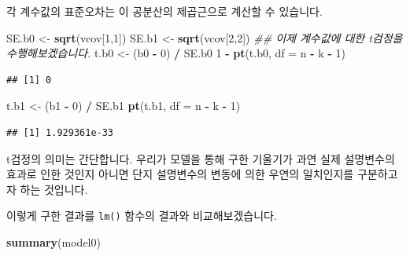 \documentclass[]{book}
\newenvironment{Shaded}{\begin{snugshade}}{\end{snugshade}}
\newcommand{\CommentTok}[1]{\textcolor[rgb]{0.56,0.35,0.01}{\textit{#1}}}
\newcommand{\DataTypeTok}[1]{\textcolor[rgb]{0.13,0.29,0.53}{#1}}
\newcommand{\DecValTok}[1]{\textcolor[rgb]{0.00,0.00,0.81}{#1}}
\newcommand{\KeywordTok}[1]{\textcolor[rgb]{0.13,0.29,0.53}{\textbf{#1}}}
\newcommand{\NormalTok}[1]{#1}
\newcommand{\OperatorTok}[1]{\textcolor[rgb]{0.81,0.36,0.00}{\textbf{#1}}}
\newcommand{\StringTok}[1]{\textcolor[rgb]{0.31,0.60,0.02}{#1}}
\begin{document}
각 계수값의 표준오차는 이 공분산의 제곱근으로 계산할 수 있습니다.

\begin{Shaded}
\begin{Highlighting}[]
\NormalTok{SE.b0 <-}\StringTok{ }\KeywordTok{sqrt}\NormalTok{(vcov[}\DecValTok{1}\NormalTok{,}\DecValTok{1}\NormalTok{])}
\NormalTok{SE.b1 <-}\StringTok{ }\KeywordTok{sqrt}\NormalTok{(vcov[}\DecValTok{2}\NormalTok{,}\DecValTok{2}\NormalTok{])}
\CommentTok{## 이제 계수값에 대한 t검정을 수행해보겠습니다.}
\NormalTok{t.b0 <-}\StringTok{ }\NormalTok{(b0 }\OperatorTok{-}\StringTok{ }\DecValTok{0}\NormalTok{) }\OperatorTok{/}\StringTok{ }\NormalTok{SE.b0}
\DecValTok{1} \OperatorTok{-}\StringTok{ }\KeywordTok{pt}\NormalTok{(t.b0, }\DataTypeTok{df =}\NormalTok{ n }\OperatorTok{-}\StringTok{ }\NormalTok{k }\OperatorTok{-}\StringTok{ }\DecValTok{1}\NormalTok{)}
\end{Highlighting}
\end{Shaded}

\begin{verbatim}
## [1] 0
\end{verbatim}

\begin{Shaded}
\begin{Highlighting}[]
\NormalTok{t.b1 <-}\StringTok{ }\NormalTok{(b1 }\OperatorTok{-}\StringTok{ }\DecValTok{0}\NormalTok{) }\OperatorTok{/}\StringTok{ }\NormalTok{SE.b1}
\KeywordTok{pt}\NormalTok{(t.b1, }\DataTypeTok{df =}\NormalTok{ n }\OperatorTok{-}\StringTok{ }\NormalTok{k }\OperatorTok{-}\StringTok{ }\DecValTok{1}\NormalTok{)}
\end{Highlighting}
\end{Shaded}

\begin{verbatim}
## [1] 1.929361e-33
\end{verbatim}

t검정의 의미는 간단합니다. 우리가 모델을 통해 구한 기울기가 과연 실제 설명변수의 효과로 인한 것인지 아니면 단지 설명변수의 변동에 의한 우연의 일치인지를 구분하고자 하는 것입니다.

이렇게 구한 결과를 \texttt{lm()} 함수의 결과와 비교해보겠습니다.

\begin{Shaded}
\begin{Highlighting}[]
\KeywordTok{summary}\NormalTok{(model0)}
\end{Highlighting}
\end{Shaded}
\end{document}
